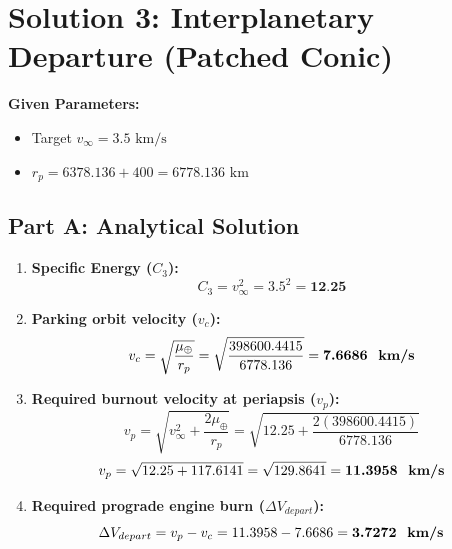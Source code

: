 \documentclass[12pt]{article}
\begin{document}
\newpage

\section*{Solution 3: Interplanetary Departure (Patched Conic)}

\textbf{Given Parameters:}
\begin{itemize}
    \item Target $v_\infty = 3.5 \text{ km/s}$
    \item $r_p = 6378.136 + 400 = 6778.136 \text{ km}$
\end{itemize}

\subsection*{Part A: Analytical Solution}
\begin{enumerate}
    \item \textbf{Specific Energy ($C_3$):}
    \begin{equation*}
        C_3 = v_\infty^2 = 3.5^2 = \textbf{12.25} 
    \end{equation*}

    \item \textbf{Parking orbit velocity ($v_c$):}
    \begin{equation*}
        v_c = \sqrt{\frac{\mu_{\oplus}}{r_p}} = \sqrt{\frac{398600.4415}{6778.136}} = \textbf{7.6686 \text{ km/s}}
    \end{equation*}

    \item \textbf{Required burnout velocity at periapsis ($v_p$):}
    \begin{equation*}
        v_p = \sqrt{v_\infty^2 + \frac{2\mu_{\oplus}}{r_p}} = \sqrt{12.25 + \frac{2(398600.4415)}{6778.136}}
    \end{equation*}
    \begin{equation*}
        v_p = \sqrt{12.25 + 117.6141} = \sqrt{129.8641} = \textbf{11.3958 \text{ km/s}}
    \end{equation*}

    \item \textbf{Required prograde engine burn ($\Delta V_{depart}$):}
    \begin{equation*}
        \Delta V_{depart} = v_p - v_c = 11.3958 - 7.6686 = \textbf{3.7272 \text{ km/s}}
    \end{equation*}
\end{enumerate}
\end{document}
